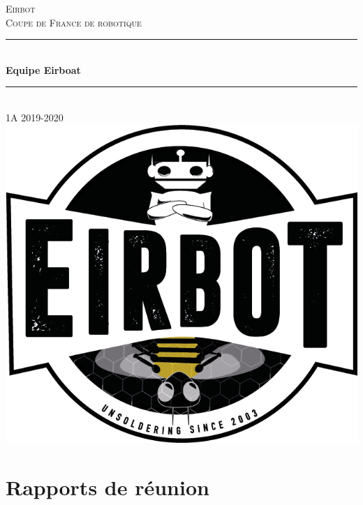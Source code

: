 \documentclass[a4paper,10pt]{report}
\newcommand{\HRule}{\rule{\linewidth}{0.1mm}}
\begin{document}
\begin{spacing}{1.5}
\graphicspath{{image/}}
\begin{titlepage}
\begin{sffamily}
\begin{center}
\textsc{\LARGE Eirbot \\ Coupe de France de robotique}\\[2cm]
\HRule \\[0.4cm]
{\huge \bfseries Equipe Eirboat \\[0.4cm]}

\HRule \\[2cm]

\textsc{\Large 1A 2019-2020}\\[2cm]
              \includegraphics[scale=0.3]{LogoEirbot.png} \vfill

  \end{center}
  \end{sffamily}
\end{titlepage}

\setcounter{tocdepth}{1}
\newpage
\part{Rapports de réunion}
\pagestyle{fancy}
\rhead{\thepage}
\lfoot{}
\cfoot{}
\rfoot{}


\end{spacing}
\end{document}
